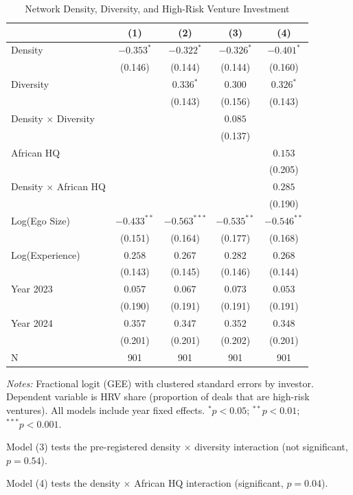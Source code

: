 
\begin{table}[htbp]
\centering
\caption{Network Density, Diversity, and High-Risk Venture Investment}
\label{tab:main_results}
\begin{tabular}{lcccc}
\toprule
 & (1) & (2) & (3) & (4) \\
\midrule
Density & $-0.353^{*}$ & $-0.322^{*}$ & $-0.326^{*}$ & $-0.401^{*}$ \\
 & (0.146) & (0.144) & (0.144) & (0.160) \\
Diversity &  & $0.336^{*}$ & $0.300$ & $0.326^{*}$ \\
 &  & (0.143) & (0.156) & (0.143) \\
Density $\times$ Diversity &  &  & $0.085$ \\
 &  &  & (0.137) \\
African HQ &  &  &  & $0.153$ \\
 &  &  &  & (0.205) \\
Density $\times$ African HQ &  &  &  & $0.285$ \\
 &  &  &  & (0.190) \\
Log(Ego Size) & $-0.433^{**}$ & $-0.563^{***}$ & $-0.535^{**}$ & $-0.546^{**}$ \\
 & (0.151) & (0.164) & (0.177) & (0.168) \\
Log(Experience) & $0.258$ & $0.267$ & $0.282$ & $0.268$ \\
 & (0.143) & (0.145) & (0.146) & (0.144) \\
Year 2023 & $0.057$ & $0.067$ & $0.073$ & $0.053$ \\
 & (0.190) & (0.191) & (0.191) & (0.191) \\
Year 2024 & $0.357$ & $0.347$ & $0.352$ & $0.348$ \\
 & (0.201) & (0.201) & (0.202) & (0.201) \\

\midrule
N & 901 & 901 & 901 & 901 \\
\bottomrule
\end{tabular}
\begin{tablenotes}
\small
\item \textit{Notes:} Fractional logit (GEE) with clustered standard errors by investor. 
Dependent variable is HRV share (proportion of deals that are high-risk ventures). 
All models include year fixed effects. 
$^{*}p<0.05$; $^{**}p<0.01$; $^{***}p<0.001$.
\item Model (3) tests the pre-registered density $\times$ diversity interaction (not significant, $p=0.54$).
\item Model (4) tests the density $\times$ African HQ interaction (significant, $p=0.04$).
\end{tablenotes}
\end{table}
